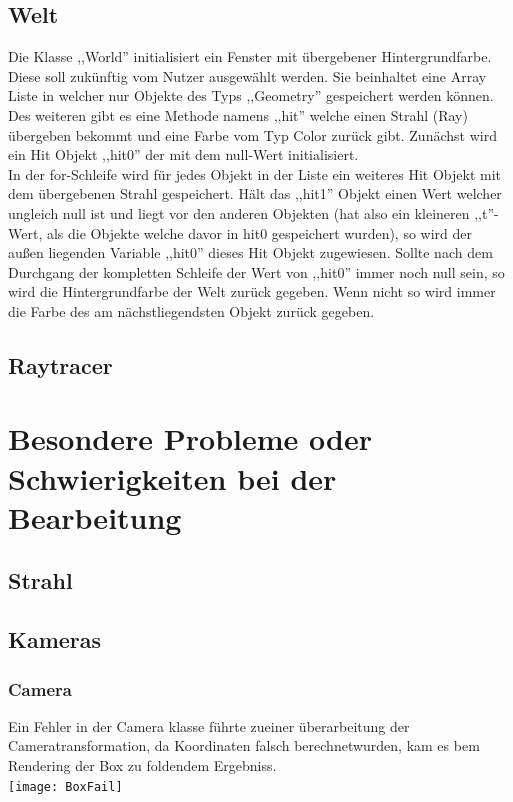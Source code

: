 \documentclass[14pt]{extarticle}
\begin{document}
\subsection{Welt}

Die Klasse ,,World'' initialisiert ein Fenster mit übergebener Hintergrundfarbe. Diese soll zukünftig vom Nutzer ausgewählt werden. Sie beinhaltet eine Array Liste in welcher nur Objekte des Typs ,,Geometry'' gespeichert werden können.\\ 
Des weiteren gibt es eine Methode namens ,,hit'' welche einen Strahl (Ray) übergeben bekommt und eine Farbe vom Typ Color zurück gibt. Zunächst wird ein Hit Objekt ,,hit0'' der mit dem null-Wert initialisiert. \\
In der for-Schleife wird für jedes Objekt in der Liste ein weiteres Hit Objekt mit dem übergebenen Strahl gespeichert. Hält das ,,hit1'' Objekt einen Wert welcher ungleich null ist und liegt vor den anderen Objekten (hat also ein kleineren ,,t''-Wert, als die Objekte welche davor in hit0 gespeichert wurden), so wird der außen liegenden Variable ,,hit0'' dieses Hit Objekt zugewiesen. Sollte nach dem Durchgang der kompletten Schleife der Wert von ,,hit0'' immer noch null sein, so wird die Hintergrundfarbe der Welt zurück gegeben. Wenn nicht so wird immer die Farbe des am nächstliegendsten Objekt zurück gegeben. 

\subsection{Raytracer}



\section{Besondere Probleme oder Schwierigkeiten bei der Bearbeitung}

\subsection{Strahl}
\subsection{Kameras}
\subsubsection{Camera}
Ein Fehler in der Camera klasse führte zueiner überarbeitung der Cameratransformation, da Koordinaten falsch berechnetwurden, kam es bem Rendering der Box zu foldendem Ergebniss.\\
\texttt{[image: BoxFail]}
\end{document}
